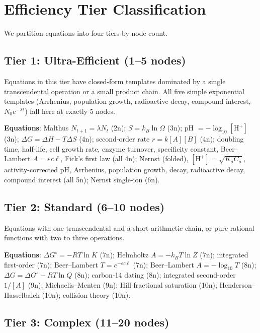\documentclass[12pt,a4paper]{article}
\theoremstyle{definition}
\begin{document}
\section{Efficiency Tier Classification}
\label{sec:tiers}

We partition equations into four tiers by node count.

\subsection*{Tier 1: Ultra-Efficient (1--5 nodes)}

Equations in this tier have closed-form templates dominated by a single
transcendental operation or a small product chain.  All five simple
exponential templates (Arrhenius, population growth, radioactive decay,
compound interest, $N_0e^{-\lambda t}$) fall here at exactly 5 nodes.

\textbf{Equations}: Malthus $N_{t+1}=\lambda N_t$ (2n);
$S=k_B\ln\Omega$ (3n); pH $= -\log_{10}[\mathrm{H}^+]$ (3n);
$\Delta G=\Delta H - T\Delta S$ (4n);
second-order rate $r=k[A][B]$ (4n);
doubling time, half-life, cell growth rate, enzyme turnover,
specificity constant, Beer--Lambert $A=\varepsilon c\ell$, Fick's first law
(all 4n);
Nernst (folded), $[\mathrm{H}^+]=\sqrt{K_a C_a}$, activity-corrected pH,
Arrhenius, population growth, decay, radioactive decay, compound interest
(all 5n); Nernst single-ion (6n).

\subsection*{Tier 2: Standard (6--10 nodes)}

Equations with one transcendental and a short arithmetic chain, or pure
rational functions with two to three operations.

\textbf{Equations}: $\Delta G^\circ=-RT\ln K$ (7n);
Helmholtz $A=-k_BT\ln Z$ (7n);
integrated first-order (7n); Beer--Lambert $T=e^{-\varepsilon c\ell}$ (7n);
Beer--Lambert $A=-\log_{10}T$ (8n);
$\Delta G = \Delta G^\circ + RT\ln Q$ (8n); carbon-14 dating (8n);
integrated second-order $1/[A]$ (9n); Michaelis--Menten (9n);
Hill fractional saturation (10n); Henderson--Hasselbalch (10n);
collision theory (10n).

\subsection*{Tier 3: Complex (11--20 nodes)}
\end{document}
